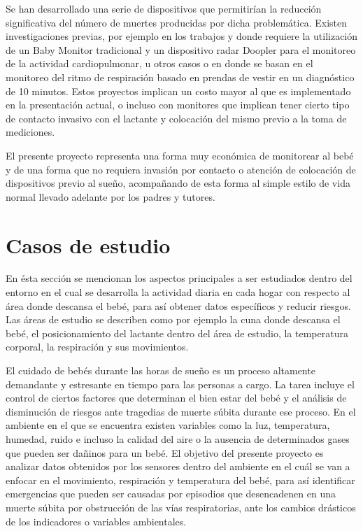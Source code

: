\documentclass{IEEEtran}
\begin{document}
		Se han desarrollado una serie de dispositivos que permitirían la reducción significativa del número de muertes producidas por dicha problemática. Existen investigaciones previas, por ejemplo en los trabajos \cite{teodorescu2000respiration} y \cite{hafner2007non} donde requiere la utilización de un Baby Monitor tradicional y un dispositivo radar Doopler para el monitoreo de la actividad cardiopulmonar, u otros casos \cite{brady2005garment} o \cite{lee2012baby} en donde se basan en el monitoreo del ritmo de respiración basado en prendas de vestir en un diagnóstico de 10 minutos. Estos proyectos implican un costo mayor al que es implementado en la presentación actual, o incluso con monitores que implican tener cierto tipo de contacto invasivo con el lactante y colocación del mismo previo a la toma de mediciones. 
		
		El presente proyecto representa una forma muy económica de monitorear al bebé y de una forma que no requiera invasión por contacto o atención de colocación de dispositivos previo al sueño, acompañando de esta forma al simple estilo de vida normal llevado adelante por los padres y tutores.

	\section{Casos de estudio}

		En ésta sección se mencionan los aspectos principales a ser estudiados dentro del entorno en el cual se desarrolla la actividad diaria en cada hogar con respecto al área donde descansa el bebé, para así obtener datos específicos y reducir riesgos. Las áreas de estudio se describen como por ejemplo la cuna donde descansa el bebé, el posicionamiento del lactante dentro del área de estudio, la temperatura corporal, la respiración y sus movimientos.

		El cuidado de bebés durante las horas de sueño es un proceso altamente demandante y estresante en tiempo para las personas a cargo. La tarea incluye el control de ciertos factores que determinan el bien estar del bebé y el análisis de disminución de riesgos ante tragedias de muerte súbita durante ese proceso. En el ambiente en el que se encuentra existen variables como la luz, temperatura, humedad, ruido e incluso la calidad del aire o la ausencia de determinados gases que pueden ser dañinos para un bebé. El objetivo del presente proyecto es analizar datos obtenidos por los sensores dentro del ambiente en el cuál se van a enfocar en el movimiento, respiración y temperatura del bebé, para así identificar emergencias que pueden ser causadas por episodios que desencadenen en una muerte súbita por obstrucción de las vías respiratorias, ante los cambios drásticos de los indicadores o variables ambientales.
		
\end{document}
